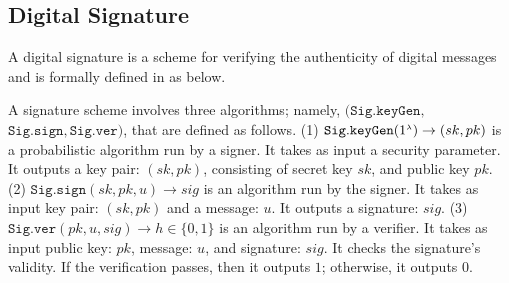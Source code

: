 \vspace{-4mm}

\subsection{Digital Signature}\label{subsec:DS}
\vspace{-1mm}


A digital signature is a scheme for verifying the authenticity of digital messages and is formally defined in \cite{DBLP:books/crc/KatzLindell2014}  as below.
%
%
\vspace{-1mm}
\begin{definition}\label{sec::def}
A signature scheme  involves three algorithms; namely, $(\mathtt{Sig.keyGen}, $ $\mathtt{Sig.sign}, \mathtt{Sig.ver})$, that are defined as follows. (1) $\mathtt{Sig.keyGen}(1^{\scriptscriptstyle \lambda})\rightarrow (sk,pk)$ is a probabilistic algorithm run by  a  signer. It takes as input a security parameter. It outputs a key pair: $(sk,pk)$, consisting of secret key $sk$, and public key $pk$. (2) $\mathtt{Sig.sign}(sk, pk, u)\rightarrow sig$ is an algorithm run by the signer. It takes as input  key pair: $(sk,pk)$ and a message: $u$. It outputs a signature: $sig$. (3) $\mathtt{Sig.ver}( pk, u, sig)\rightarrow h\in\{0,1\}$ is an algorithm run by a verifier. It takes as input  public key: $pk$,  message: $u$, and signature: $sig$. It checks the signature's validity.   If the verification passes, then it outputs $1$; otherwise, it outputs $0$. 
\end{definition}


